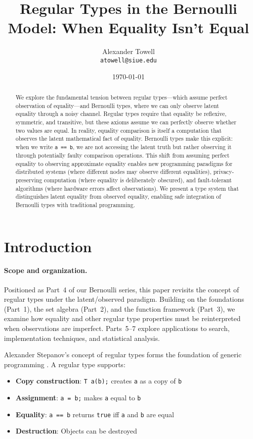 \documentclass[11pt,final,hidelinks]{article}
\title{Regular Types in the Bernoulli Model: When Equality Isn't Equal}
\author{
    Alexander Towell\\
    \texttt{atowell@siue.edu}
}
\date{\today}
\newcommand{\code}[1]{\texttt{#1}}
\begin{document}
\maketitle
\NotationSection

\begin{abstract}
We explore the fundamental tension between regular types—which assume perfect observation of equality—and Bernoulli types, where we can only observe latent equality through a noisy channel. Regular types require that equality be reflexive, symmetric, and transitive, but these axioms assume we can perfectly observe whether two values are equal. In reality, equality comparison is itself a computation that observes the latent mathematical fact of equality. Bernoulli types make this explicit: when we write \code{a == b}, we are not accessing the latent truth but rather observing it through potentially faulty comparison operations. This shift from assuming perfect equality to observing approximate equality enables new programming paradigms for distributed systems (where different nodes may observe different equalities), privacy-preserving computation (where equality is deliberately obscured), and fault-tolerant algorithms (where hardware errors affect observations). We present a type system that distinguishes latent equality from observed equality, enabling safe integration of Bernoulli types with traditional programming.
\end{abstract}

\section{Introduction}

\paragraph{Scope and organization.}  Positioned as Part~4 of our Bernoulli series, this paper revisits the concept of regular types under the latent/observed paradigm.  Building on the foundations (Part~1), the set algebra (Part~2), and the function framework (Part~3), we examine how equality and other regular type properties must be reinterpreted when observations are imperfect.  Parts~5--7 explore applications to search, implementation techniques, and statistical analysis.

Alexander Stepanov's concept of regular types forms the foundation of generic programming \cite{stepanov2014}. A regular type supports:
\begin{itemize}
    \item \textbf{Copy construction}: \code{T a(b);} creates \code{a} as a copy of \code{b}
    \item \textbf{Assignment}: \code{a = b;} makes \code{a} equal to \code{b}
    \item \textbf{Equality}: \code{a == b} returns \code{true} iff \code{a} and \code{b} are equal
    \item \textbf{Destruction}: Objects can be destroyed
\end{itemize}
\end{document}
